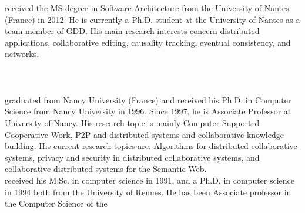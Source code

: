 
received the MS degree in Software Architecture from the University of Nantes
(France) in 2012. He is currently a Ph.D. student at the University of Nantes as
a team member of GDD. His main research interests concern distributed
applications, collaborative editing, causality tracking,  eventual
consistency, and networks. \\ \\
\ \\ \ \\
graduated from Nancy University (France) and received his Ph.D. in Computer
Science from Nancy University in 1996. Since 1997, he is Associate Professor at
University of Nancy. His research topic is mainly Computer Supported Cooperative
Work, P2P and distributed systems and collaborative knowledge building. His
current research topics are: Algorithms for distributed collaborative systems,
privacy and security in distributed collaborative systems, and collaborative
distributed systems for the Semantic Web.
\\ 
 received his M.Sc.  in computer science in
1991, and a Ph.D. in computer science in 1994 both from the University of
Rennes. He has been Associate professor in the Computer Science of the
